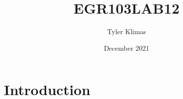 \documentclass{article}
\title{EGR103LAB12}
\author{Tyler Klimas}
\date{December 2021}
\begin{document}
\maketitle

\section{Introduction}
\end{document}
